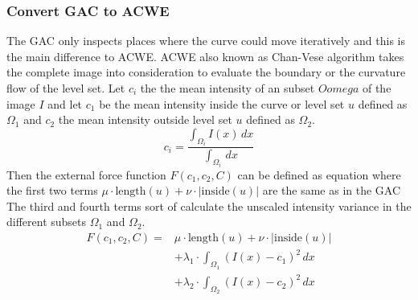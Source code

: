 \subsubsection{Convert GAC to ACWE}
The GAC only inspects places where the curve could move iteratively and this is the main difference to ACWE. ACWE also known as Chan-Vese algorithm takes the complete image into consideration to evaluate the boundary or the curvature flow of the level set. 
Let $c_i$ the the mean intensity of an subset $Oomega$ of the image $I$ and let $c_1$ be the mean intensity inside the curve or level set $u$ defined as $\Omega_1$ and $c_2$ the mean intensity outside level set $u$ defined as $\Omega_2$. 
\begin{equation}
    c_{i}= \frac{ \int_{\Omega_{i}} I(x) \,dx}{\int_{\Omega_{i}} \, dx }
\end{equation}
Then the external force function $F(c_1,c_2,C)$ can be defined as equation  where the first two terms $\mu \cdot \text{length}(u) + \nu \cdot |\text{inside}(u)|$ are the same as in the GAC The third and fourth terms sort of calculate the unscaled intensity variance in the different subsets $\Omega_1$ and $\Omega_2$. 
\begin{equation}
    \begin{split}
    F(c_1, c_2, C) = & \mu \cdot \text{length}(u) + \nu \cdot |\text{inside}(u)| \\
    & + \lambda_1 \cdot \int_{\Omega_1} (I(x) - c_1)^2 \, dx \\
    & + \lambda_2 \cdot \int_{\Omega_2} (I(x) - c_2)^2 \, dx
    \end{split}
    \label{curvatureflow}
    \end{equation}


